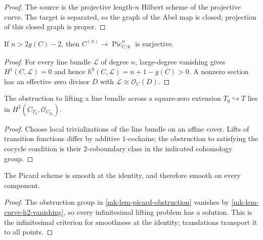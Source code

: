 \begin{proof}
  The source is the projective length-\(n\) Hilbert scheme of the projective
  curve.  The target is separated, so the graph of the Abel map is closed;
  projection of this closed graph is proper.
\end{proof}

\begin{proposition}
  \label{mk-prop-abel-surjective}
  \cite{kleiman-picard}
  If \(n>2g(C)-2\), then \(C^{(n)}\to\operatorname{Pic}^n_{C/k}\) is
  surjective.
\end{proposition}

\begin{proof}
  For every line bundle \(\mathcal L\) of degree \(n\), large-degree vanishing
  gives \(H^1(C,\mathcal L)=0\) and hence
  \(h^0(C,\mathcal L)=n+1-g(C)>0\).  A nonzero section has an effective zero
  divisor \(D\) with \(\mathcal L\cong\mathcal O_C(D)\).
\end{proof}

\begin{lemma}
  \label{mk-lem-picard-obstruction}
  \cite{kleiman-picard}
  The obstruction to lifting a line bundle across a square-zero extension
  \(T_0\hookrightarrow T\) lies in \(H^2(C_{T_0},\mathcal O_{C_{T_0}})\).
\end{lemma}

\begin{proof}
  Choose local trivializations of the line bundle on an affine cover.  Lifts of
  transition functions differ by additive \(1\)-cochains; the obstruction to
  satisfying the cocycle condition is their \(2\)-coboundary class in the
  indicated cohomology group.
\end{proof}

\begin{proposition}
  \label{mk-prop-picard-smooth}
  \cite{kleiman-picard}
  The Picard scheme is smooth at the identity, and therefore smooth on every
  component.
\end{proposition}

\begin{proof}
  The obstruction group in \ref{mk-lem-picard-obstruction} vanishes by
  \ref{mk-lem-curve-h2-vanishing}, so every infinitesimal lifting problem has a
  solution.  This is the infinitesimal criterion for smoothness at the identity;
  translations transport it to all points.
\end{proof}

